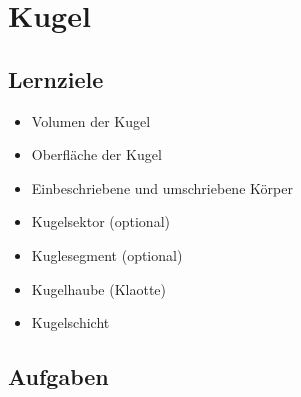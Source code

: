 \section{Kugel}



\subsection*{Lernziele}
\begin{itemize}
\item Volumen der Kugel
\item Oberfläche der Kugel
\item Einbeschriebene und umschriebene Körper
\item Kugelsektor (optional)
\item Kuglesegment (optional)
\item Kugelhaube (Klaotte)
\item Kugelschicht
\end{itemize}

\subsection*{Aufgaben}
\newpage
